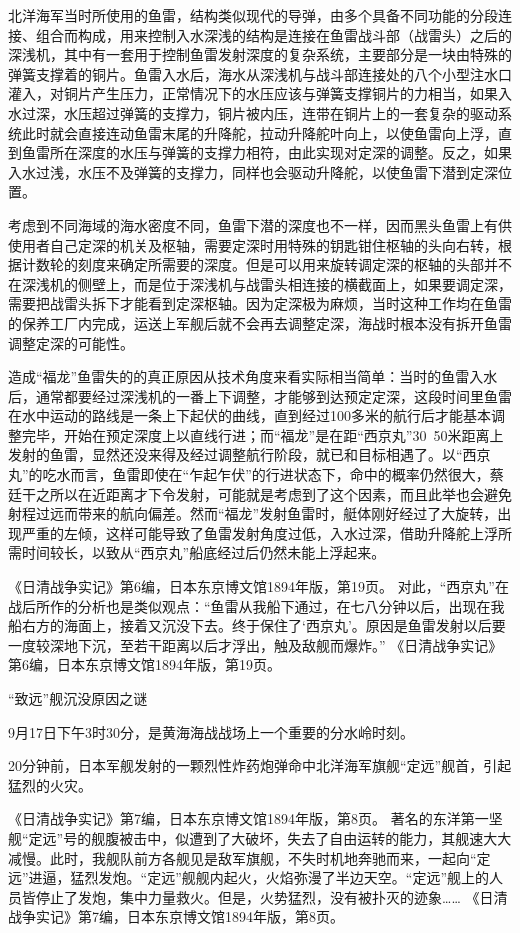 \documentclass[12pt,UTF8]{ctexbook}
\begin{document}
北洋海军当时所使用的鱼雷，结构类似现代的导弹，由多个具备不同功能的分段连接、组合而构成，用来控制入水深浅的结构是连接在鱼雷战斗部（战雷头）之后的深浅机，其中有一套用于控制鱼雷发射深度的复杂系统，主要部分是一块由特殊的弹簧支撑着的铜片。鱼雷入水后，海水从深浅机与战斗部连接处的八个小型注水口灌入，对铜片产生压力，正常情况下的水压应该与弹簧支撑铜片的力相当，如果入水过深，水压超过弹簧的支撑力，铜片被内压，连带在铜片上的一套复杂的驱动系统此时就会直接连动鱼雷末尾的升降舵，拉动升降舵叶向上，以使鱼雷向上浮，直到鱼雷所在深度的水压与弹簧的支撑力相符，由此实现对定深的调整。反之，如果入水过浅，水压不及弹簧的支撑力，同样也会驱动升降舵，以使鱼雷下潜到定深位置。

考虑到不同海域的海水密度不同，鱼雷下潜的深度也不一样，因而黑头鱼雷上有供使用者自己定深的机关及枢轴，需要定深时用特殊的钥匙钳住枢轴的头向右转，根据计数轮的刻度来确定所需要的深度。但是可以用来旋转调定深的枢轴的头部并不在深浅机的侧壁上，而是位于深浅机与战雷头相连接的横截面上，如果要调定深，需要把战雷头拆下才能看到定深枢轴。因为定深极为麻烦，当时这种工作均在鱼雷的保养工厂内完成，运送上军舰后就不会再去调整定深，海战时根本没有拆开鱼雷调整定深的可能性。

造成“福龙”鱼雷失的的真正原因从技术角度来看实际相当简单：当时的鱼雷入水后，通常都要经过深浅机的一番上下调整，才能够到达预定定深，这段时间里鱼雷在水中运动的路线是一条上下起伏的曲线，直到经过100多米的航行后才能基本调整完毕，开始在预定深度上以直线行进；而“福龙”是在距“西京丸”30~50米距离上发射的鱼雷，显然还没来得及经过调整航行阶段，就已和目标相遇了。以“西京丸”的吃水而言，鱼雷即使在“乍起乍伏”的行进状态下，命中的概率仍然很大，蔡廷干之所以在近距离才下令发射，可能就是考虑到了这个因素，而且此举也会避免射程过远而带来的航向偏差。然而“福龙”发射鱼雷时，艇体刚好经过了大旋转，出现严重的左倾，这样可能导致了鱼雷发射角度过低，入水过深，借助升降舵上浮所需时间较长，以致从“西京丸”船底经过后仍然未能上浮起来。

《日清战争实记》第6编，日本东京博文馆1894年版，第19页。
对此，“西京丸”在战后所作的分析也是类似观点：“鱼雷从我船下通过，在七八分钟以后，出现在我船右方的海面上，接着又沉没下去。终于保住了‘西京丸’。原因是鱼雷发射以后要一度较深地下沉，至若干距离以后才浮出，触及敌舰而爆炸。” 《日清战争实记》第6编，日本东京博文馆1894年版，第19页。

“致远”舰沉没原因之谜

9月17日下午3时30分，是黄海海战战场上一个重要的分水岭时刻。

20分钟前，日本军舰发射的一颗烈性炸药炮弹命中北洋海军旗舰“定远”舰首，引起猛烈的火灾。

《日清战争实记》第7编，日本东京博文馆1894年版，第8页。
著名的东洋第一坚舰“定远”号的舰腹被击中，似遭到了大破坏，失去了自由运转的能力，其舰速大大减慢。此时，我舰队前方各舰见是敌军旗舰，不失时机地奔驰而来，一起向“定远”进逼，猛烈发炮。“定远”舰舰内起火，火焰弥漫了半边天空。“定远”舰上的人员皆停止了发炮，集中力量救火。但是，火势猛烈，没有被扑灭的迹象…… 《日清战争实记》第7编，日本东京博文馆1894年版，第8页。
\end{document}
